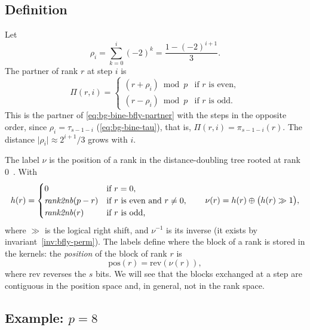\subsection{Definition}\label{sec:bfly-def}

Let
\begin{equation}
  \rho_i=\sum_{k=0}^{i}(-2)^k=\frac{1-(-2)^{i+1}}{3}.
  \label{eq:bfly-rho}
\end{equation}
The partner of rank $r$ at step $i$ is
\begin{equation}
  \Pi(r,i)=
  \begin{cases}
    (r+\rho_i)\bmod p & \text{if $r$ is even},\\
    (r-\rho_i)\bmod p & \text{if $r$ is odd}.
  \end{cases}
  \label{eq:bfly-partner}
\end{equation}
This is the partner of \cref{eq:bg-bine-bfly-partner} with the steps in the opposite order, since $\rho_i=\tau_{s-1-i}$ (\cref{eq:bg-bine-tau}), that is, $\Pi(r,i)=\pi_{s-1-i}(r)$.
The distance $\lvert\rho_i\rvert\approx 2^{i+1}/3$ grows with $i$.

The label $\nu$ is the position of a rank in the distance-doubling \bine{} tree rooted at rank $0$~\cite{desensi2025bine}.
With
\begin{equation}
  h(r)=
  \begin{cases}
    0 & \text{if } r=0,\\
    \mathit{rank2nb}(p-r) & \text{if $r$ is even and } r\neq0,\\
    \mathit{rank2nb}(r) & \text{if $r$ is odd,}
  \end{cases}
  \qquad
  \nu(r)=h(r)\oplus\bigl(h(r)\gg1\bigr),
  \label{eq:bfly-nu}
\end{equation}
where $\gg$ is the logical right shift, and $\nu^{-1}$ is its inverse (it exists by invariant~\ref{inv:bfly-perm}).
The labels define where the block of a rank is stored in the kernels: the \emph{position} of the block of rank $r$ is
\begin{equation}
  \mathrm{pos}(r)=\mathrm{rev}(\nu(r)),
\end{equation}
where $\mathrm{rev}$ reverses the $s$ bits.
We will see that the blocks exchanged at a step are contiguous in the position space and, in general, not in the rank space.

\subsection{Example: $p=8$}

